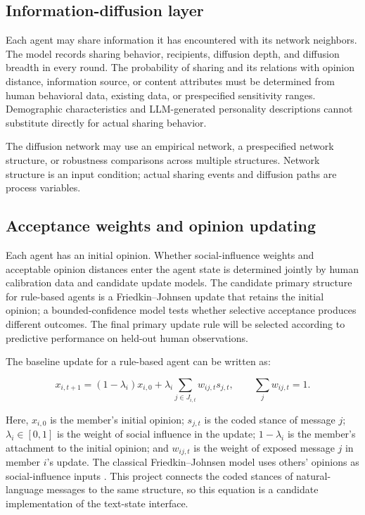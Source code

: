 \documentclass[11pt,a4paper]{article}
\begin{document}
\subsection{Information-diffusion layer}

Each agent may share information it has encountered with its network neighbors. The model records sharing behavior, recipients, diffusion depth, and diffusion breadth in every round. The probability of sharing and its relations with opinion distance, information source, or content attributes must be determined from human behavioral data, existing data, or prespecified sensitivity ranges. Demographic characteristics and LLM-generated personality descriptions cannot substitute directly for actual sharing behavior.

The diffusion network may use an empirical network, a prespecified network structure, or robustness comparisons across multiple structures. Network structure is an input condition; actual sharing events and diffusion paths are process variables.

\subsection{Acceptance weights and opinion updating}

Each agent has an initial opinion. Whether social-influence weights and acceptable opinion distances enter the agent state is determined jointly by human calibration data and candidate update models. The candidate primary structure for rule-based agents is a Friedkin--Johnsen update that retains the initial opinion; a bounded-confidence model tests whether selective acceptance produces different outcomes. The final primary update rule will be selected according to predictive performance on held-out human observations.

The baseline update for a rule-based agent can be written as:

\begin{equation*}
x_{i,t+1}
=
(1-\lambda_i)x_{i,0}
+
\lambda_i
\sum_{j\in J_{i,t}}
w_{ij,t}s_{j,t},
\qquad
\sum_jw_{ij,t}=1.
\end{equation*}

Here, $x_{i,0}$ is the member's initial opinion; $s_{j,t}$ is the coded stance of message $j$; $\lambda_i\in[0,1]$ is the weight of social influence in the update; $1-\lambda_i$ is the member's attachment to the initial opinion; and $w_{ij,t}$ is the weight of exposed message $j$ in member $i$'s update. The classical Friedkin--Johnsen model uses others' opinions as social-influence inputs \cite{friedkin1990}. This project connects the coded stances of natural-language messages to the same structure, so this equation is a candidate implementation of the text-state interface.
\end{document}
